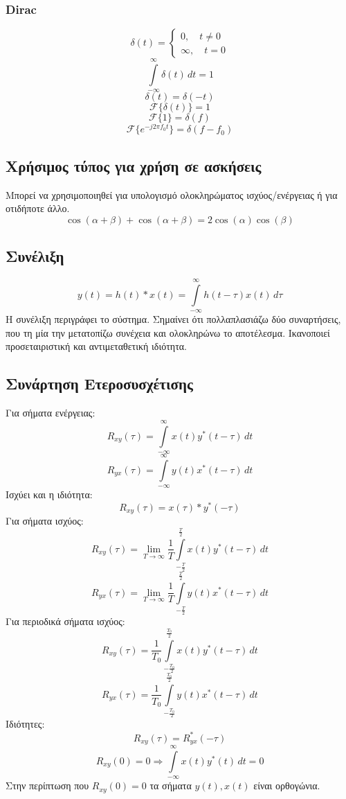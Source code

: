 \documentclass[a4paper,12pt]{article}
\begin{document}
\subsubsection*{Dirac}
\[
\delta(t) = 
\begin{cases}
0, \quad t \neq 0 \\
\infty, \quad t = 0
\end{cases}
\]
\[
\int\limits^{\infty}_{-\infty} \delta(t) \, dt=1
\]
\[
\delta(t)=\delta(-t)
\]
\[
\mathcal{F}\{\delta(t)\}=1
\]
\[
\mathcal{F}\{1\}=\delta(f)
\]
\[
\mathcal{F}\{e^{-j 2\pi f_0 t}\}=\delta(f-f_0)
\]

\subsection*{Χρήσιμος τύπος για χρήση σε ασκήσεις}
Μπορεί να χρησιμοποιηθεί για υπολογισμό ολοκληρώματος ισχύος/ενέργειας ή για οτιδήποτε άλλο.
\[
\cos(\alpha + \beta) + \cos(\alpha + \beta) =2\cos(\alpha)\cos(\beta)
\]

\subsection*{Συνέλιξη}
\[
y(t)=h(t) \ast x(t)=\int\limits_{-\infty}^{\infty} h(t-\tau)x(t) \, d\tau
\]
Η συνέλιξη περιγράφει το σύστημα. Σημαίνει ότι πολλαπλασιάζω δύο συναρτήσεις, που τη μία την μετατοπίζω συνέχεια και ολοκληρώνω το αποτέλεσμα. Ικανοποιεί προσεταιριστική και αντιμεταθετική ιδιότητα.

\subsection*{Συνάρτηση Ετεροσυσχέτισης}
Για σήματα ενέργειας:
\[
R_{xy}(\tau)=\int\limits^{\infty}_{-\infty}x(t)y^\ast(t-\tau) \, dt
\]
\[
R_{yx}(\tau)=\int\limits^\infty_{-\infty} y(t)x^\ast(t-\tau) \, dt
\]
Ισχύει και η ιδιότητα:
\[
R_{xy}(\tau)=x(\tau) \ast y^\ast (-\tau)
\]
Για σήματα ισχύος:
\[
R_{xy}(\tau)=\underset{T \to \infty}{\lim} \frac{1}{T} \int\limits^{\frac{T}{2}}_{-\frac{T}{2}} x(t)y^\ast(t-\tau) \, dt
\]
\[
R_{yx}(\tau)=\underset{T \to \infty}{\lim} \frac{1}{T} \int\limits^{\frac{T}{2}}_{-\frac{T}{2}} y(t)x^\ast(t-\tau) \, dt
\]
Για περιοδικά σήματα ισχύος:
\[
R_{xy}(\tau)=\frac{1}{T_0} \int\limits^{\frac{T_0}{2}}_{-\frac{T_0}{2}} x(t)y^\ast(t-\tau) \, dt
\]
\[
R_{yx}(\tau)=\frac{1}{T_0} \int\limits^{\frac{T_0}{2}}_{-\frac{T_0}{2}} y(t)x^\ast(t-\tau) \, dt
\]
Ιδιότητες:
\[
R_{xy}(\tau)=R^\ast_{yx}(-\tau)
\]
\[
R_{xy}(0)=0 \Rightarrow \int\limits^\infty_{-\infty} x(t)y^\ast(t) \, dt=0
\]
Στην περίπτωση που \(R_{xy}(0)=0\) τα σήματα \(y(t),x(t)\) είναι ορθογώνια.
\end{document}
